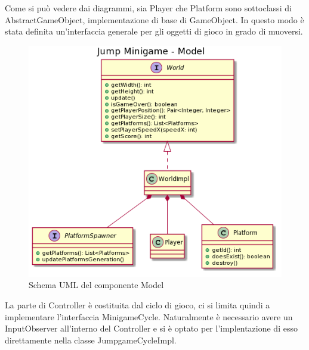 \documentclass[a4paper,12pt]{report}
\begin{document}
	Come si può vedere dai diagrammi, sia Player che Platform sono sottoclassi di AbstractGameObject, implementazione di base di GameObject.
    In questo modo è stata definita un'interfaccia generale per gli oggetti di gioco in grado di muoversi.\newline
    \begin{figure}[!t]
        \centering{}
        \includegraphics[width=150mm]{images/picchiotti/jumpmodel.png}
        \caption{Schema UML del componente Model}
        \label{img:jumpmodel}
    \end{figure}
	La parte di Controller è costituita dal ciclo di gioco, ci si limita quindi a implementare l'interfaccia MinigameCycle.
    Naturalmente è necessario avere un InputObserver all'interno del Controller e si è optato per l'implentazione di esso direttamente nella classe JumpgameCycleImpl.
\end{document}

